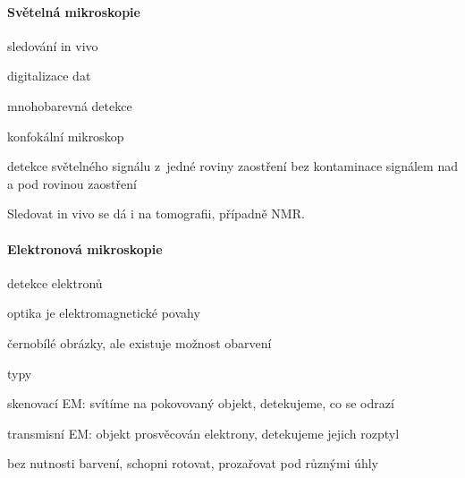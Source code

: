 \documentclass[DIV=8]{scrreprt}
\begin{document}
\paragraph{Světelná mikroskopie}
\begin{myItemize}[nosep]
    \item sledování in vivo
    \item digitalizace dat
    \item mnohobarevná detekce
    \item konfokální mikroskop
\begin{myItemize}[nosep]
    \item detekce světelného signálu z jedné roviny zaostření bez kontaminace signálem nad a pod rovinou zaostření
\end{myItemize}

\end{myItemize}



Sledovat in vivo se dá i na tomografii, případně NMR.

\paragraph{Elektronová mikroskopie}
\begin{myItemize}[nosep]
    \item detekce elektronů
    \item optika je elektromagnetické povahy
    \item černobílé obrázky, ale existuje možnost obarvení
    \item typy
\begin{myItemize}[nosep]
    \item skenovací EM: svítíme na pokovovaný objekt, detekujeme, co se odrazí
    \item transmisní EM: objekt prosvěcován elektrony, detekujeme jejich rozptyl
\begin{myItemize}[nosep]
    \item bez nutnosti barvení, schopni rotovat, prozařovat pod různými úhly
\end{myItemize}

\end{myItemize}

\end{myItemize}
\end{document}
